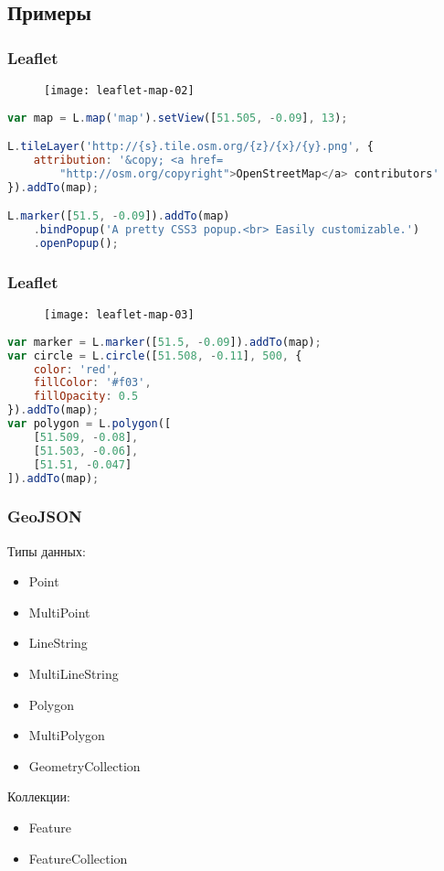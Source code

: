 \subsection{Примеры}
\begin{frame}[fragile]
    \frametitle{Leaflet}
    \begin{figure}[ht!]
        \texttt{[image: leaflet-map-02]}
    \end{figure}
    \begin{lstlisting}[language=JavaScript]
var map = L.map('map').setView([51.505, -0.09], 13);

L.tileLayer('http://{s}.tile.osm.org/{z}/{x}/{y}.png', {
    attribution: '&copy; <a href=
        "http://osm.org/copyright">OpenStreetMap</a> contributors'
}).addTo(map);

L.marker([51.5, -0.09]).addTo(map)
    .bindPopup('A pretty CSS3 popup.<br> Easily customizable.')
    .openPopup();
    \end{lstlisting}
\end{frame}

\begin{frame}[fragile]
    \frametitle{Leaflet}
    \begin{figure}[ht!]
        \texttt{[image: leaflet-map-03]}
    \end{figure}
    \begin{lstlisting}[language=JavaScript]
var marker = L.marker([51.5, -0.09]).addTo(map);
var circle = L.circle([51.508, -0.11], 500, {
    color: 'red',
    fillColor: '#f03',
    fillOpacity: 0.5
}).addTo(map);
var polygon = L.polygon([
    [51.509, -0.08],
    [51.503, -0.06],
    [51.51, -0.047]
]).addTo(map);
    \end{lstlisting}
\end{frame}

\begin{frame}
    \frametitle{GeoJSON}
    \begin{minipage}[h]{0.49\textwidth}
        Типы данных:
        \begin{itemize}
            \item Point
            \item MultiPoint
            \item LineString
            \item MultiLineString
            \item Polygon
            \item MultiPolygon
            \item GeometryCollection
        \end{itemize}
    \end{minipage}
    \begin{minipage}[h]{0.49\textwidth}
        Коллекции:
        \begin{itemize}
            \item Feature
            \item FeatureCollection
        \end{itemize}
    \end{minipage}
\end{frame}

